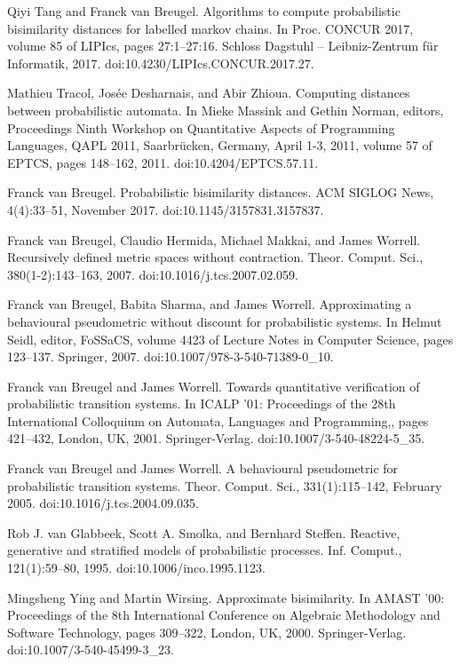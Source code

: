 \documentclass[10pt,a4paper]{article}
\begin{document}
\par\noindent  [53]  Qiyi Tang and Franck van Breugel.  Algorithms to compute probabilistic bisimilarity distances for labelled markov chains.  In Proc. CONCUR 2017, volume 85 of LIPIcs, pages 27:1–27:16. Schloss Dagstuhl – Leibniz-Zentrum für Informatik, 2017.  doi:10.4230/LIPIcs.CONCUR.2017.27.  
 
\par\noindent  [54]  Mathieu Tracol, Josée Desharnais, and Abir Zhioua.  Computing distances between probabilistic automata.  In Mieke Massink and Gethin Norman, editors, Proceedings Ninth Workshop on Quantitative Aspects of Programming Languages, QAPL 2011, Saarbrücken, Germany, April 1-3, 2011, volume 57 of EPTCS, pages 148–162, 2011.  doi:10.4204/EPTCS.57.11.  
 
\par\noindent  [55]  Franck van Breugel.  Probabilistic bisimilarity distances.  ACM SIGLOG News, 4(4):33–51, November 2017.  doi:10.1145/3157831.3157837.  
 
\par\noindent  [56]  Franck van Breugel, Claudio Hermida, Michael Makkai, and James Worrell.  Recursively defined metric spaces without contraction.  Theor. Comput. Sci., 380(1-2):143–163, 2007.  doi:10.1016/j.tcs.2007.02.059.  
 
\par\noindent  [57]  Franck van Breugel, Babita Sharma, and James Worrell.  Approximating a behavioural pseudometric without discount for probabilistic systems.  In Helmut Seidl, editor, FoSSaCS, volume 4423 of Lecture Notes in Computer Science, pages 123–137. Springer, 2007.  doi:10.1007/978-3-540-71389-0\_10.  
 
\par\noindent  [58]  Franck van Breugel and James Worrell.  Towards quantitative verification of probabilistic transition systems.  In ICALP ’01: Proceedings of the 28th International Colloquium on Automata, Languages and Programming,, pages 421–432, London, UK, 2001. Springer-Verlag.  doi:10.1007/3-540-48224-5\_35.  
 
\par\noindent  [59]  Franck van Breugel and James Worrell.  A behavioural pseudometric for probabilistic transition systems.  Theor. Comput. Sci., 331(1):115–142, February 2005.  doi:10.1016/j.tcs.2004.09.035.  
 
\par\noindent  [60]  Rob J. van Glabbeek, Scott A. Smolka, and Bernhard Steffen.  Reactive, generative and stratified models of probabilistic processes.  Inf. Comput., 121(1):59–80, 1995.  doi:10.1006/inco.1995.1123.  
 
\par\noindent  [61]  Mingsheng Ying and Martin Wirsing.  Approximate bisimilarity.  In AMAST ’00: Proceedings of the 8th International Conference on Algebraic Methodology and Software Technology, pages 309–322, London, UK, 2000. Springer-Verlag.  doi:10.1007/3-540-45499-3\_23.  
  
\end{document}
